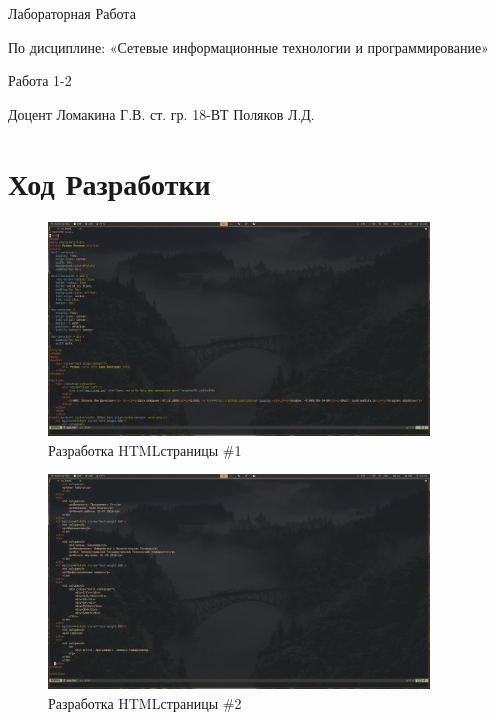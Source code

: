 \documentclass[14pt]{extarticle}
\let\oldsection\section
\renewcommand\section{\clearpage\oldsection}
\begin{document}
\unititle
{\klgtu}
{\fapu}
{\suvt}
{Лабораторная Работа}
{По дисциплине: «Сетевые информационные технологии и программирование» \par Работа 1-2}
{Доцент}
{Ломакина Г.В.}
{ст. гр. 18-ВТ}
{Поляков Л.Д.}

\tableofcontents


\section{Ход Разработки}


\begin{figure}[h]
    \centering
	\includegraphics[width=0.9\textwidth, angle=0]{2021-12-12-15-32-43}
    \caption{Разработка HTML\-страницы \#1}
    \label{fig:html1}
\end{figure}

\begin{figure}[h]
    \centering
	\includegraphics[width=0.9\textwidth, angle=0]{2021-12-12-15-32-52}
    \caption{Разработка HTML\-страницы \#2}
    \label{fig:html2}
\end{figure}
\end{document}
